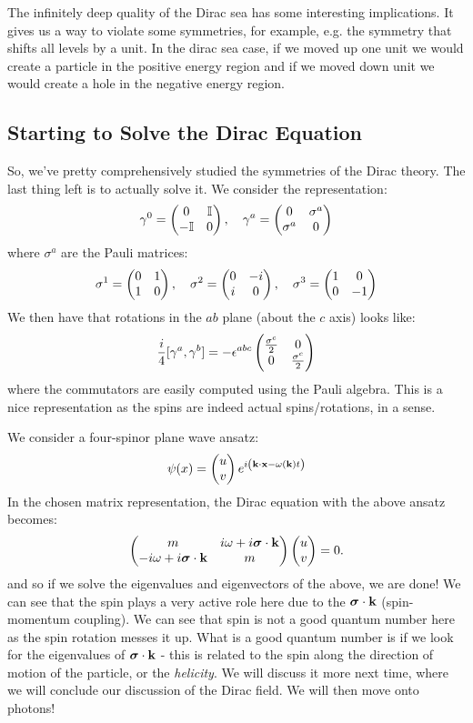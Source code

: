The infinitely deep quality of the Dirac sea has some interesting implications. It gives us a way to violate some symmetries, for example, e.g. the symmetry that shifts all levels by a unit. In the dirac sea case, if we moved up one unit we would create a particle in the positive energy region and if we moved down unit we would create a hole in the negative energy region.


\subsection{Starting to Solve the Dirac Equation}
So, we've pretty comprehensively studied the symmetries of the Dirac theory. The last thing left is to actually solve it. We consider the representation:
\begin{equation}
    \gamma^0 = \begin{pmatrix}0 & \mathbb{I} \\ -\mathbb{I} & 0\end{pmatrix}, \quad \gamma^a = \begin{pmatrix}0 & \sigma^a \\ \sigma^a & 0\end{pmatrix}
\end{equation}
where $\sigma^a$ are the Pauli matrices:
\begin{equation}
    \sigma^1 = \begin{pmatrix} 0 & 1 \\ 1 & 0 \end{pmatrix}, \quad \sigma^2 = \begin{pmatrix} 0 & -i \\ i & 0 \end{pmatrix}, \quad \sigma^3 = \begin{pmatrix} 1 & 0 \\ 0 & -1 \end{pmatrix}
\end{equation}
We then have that rotations in the $ab$ plane (about the $c$ axis) looks like:
\begin{equation}
    \frac{i}{4}[\gamma^a, \gamma^b] = -\epsilon^{abc}\begin{pmatrix}\frac{\sigma^c}{2} & 0 \\ 0 & \frac{\sigma^c}{2}\end{pmatrix}
\end{equation}
where the commutators are easily computed using the Pauli algebra. This is a nice representation as the spins are indeed actual spins/rotations, in a sense. 

We consider a four-spinor plane wave ansatz:
\begin{equation}
    \psi(x) = \begin{pmatrix}u \\ v\end{pmatrix}e^{i\left(\mathbf{k}\cdot\mathbf{x} - \omega(\mathbf{k})t\right)}
\end{equation}
In the chosen matrix representation, the Dirac equation with the above ansatz becomes:
\begin{equation}
    \begin{pmatrix}m & i\omega + i\mbox{\boldmath$ \sigma $} \cdot \mathbf{k} \\ -i\omega + i\mbox{\boldmath$ \sigma $} \cdot \mathbf{k} & m\end{pmatrix}\begin{pmatrix}u\\v\end{pmatrix} = 0.
\end{equation}
and so if we solve the eigenvalues and eigenvectors of the above, we are done! We can see that the spin plays a very active role here due to the $\mbox{\boldmath$ \sigma $}\cdot \mathbf{k}$ (spin-momentum coupling). We can see that spin is not a good quantum number here as the spin rotation messes it up. What is a good quantum number is if we look for the eigenvalues of $\mbox{\boldmath$ \sigma $} \cdot \mathbf{k}$ - this is related to the spin along the direction of motion of the particle, or the \emph{helicity}. We will discuss it more next time, where we will conclude our discussion of the Dirac field. We will then move onto photons!